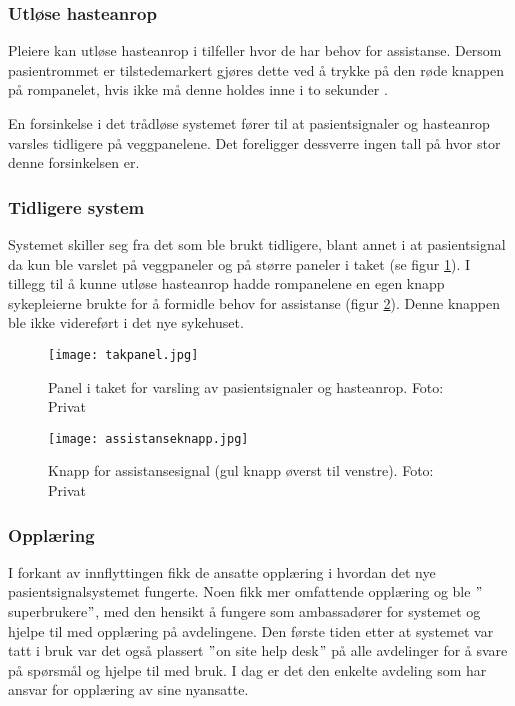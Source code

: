 \subsubsection{Utløse hasteanrop}
Pleiere kan utløse hasteanrop i tilfeller hvor de har behov for assistanse. Dersom pasientrommet er tilstedemarkert gjøres dette ved å trykke på den røde knappen på rompanelet, hvis ikke må denne holdes inne i to sekunder \citep{BrukerveiledningforPasientsignal}.

\noindent
En forsinkelse i det trådløse systemet fører til at pasientsignaler og hasteanrop varsles tidligere på veggpanelene. Det foreligger dessverre ingen tall på hvor stor denne forsinkelsen er. 

\subsubsection{Tidligere system}
Systemet skiller seg fra det som ble brukt tidligere, blant annet i at pasientsignal da kun ble varslet på veggpaneler og på større paneler i taket (se figur \ref{takpanel}). I tillegg til å kunne utløse hasteanrop hadde rompanelene en egen knapp sykepleierne brukte for å formidle behov for assistanse (figur \ref{assistanseknapp}). Denne knappen ble ikke videreført i det nye sykehuset.

\begin{figure}[H]
\centering
\texttt{[image: takpanel.jpg]}
\caption{Panel i taket for varsling av pasientsignaler og hasteanrop. Foto: Privat}
\label{takpanel}
\end{figure}
        
\begin{figure}[H]
\centering
\texttt{[image: assistanseknapp.jpg]}
\caption{Knapp for assistansesignal (gul knapp øverst til venstre). Foto: Privat}
\label{assistanseknapp}
\end{figure}

\subsubsection{Opplæring}
I forkant av innflyttingen fikk de ansatte opplæring i hvordan det nye pasientsignalsystemet fungerte. Noen fikk mer omfattende opplæring og ble $"$superbrukere$"$, med den hensikt å fungere som ambassadører for systemet og hjelpe til med opplæring på avdelingene. Den første tiden etter at systemet var tatt i bruk var det også plassert $"$on site help desk$"$ på alle avdelinger for å svare på spørsmål og hjelpe til med bruk. I dag er det den enkelte avdeling som har ansvar for opplæring av sine nyansatte. 

